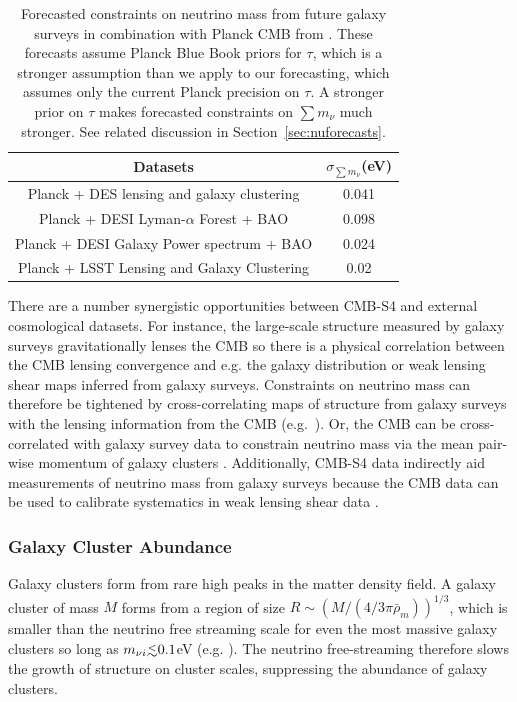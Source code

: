 \begin{table}[t!]
\begin{center}
\begin{tabular}{|c|c|} 
\hline
    				  Datasets 			& $\sigma_{\sum m_\nu}$(eV) \\
				  \hline
Planck + DES lensing and galaxy clustering 		& 			0.041		\\
\hline
Planck + DESI Lyman-$\alpha$ Forest + BAO           &			0.098		\\
\hline
Planck + DESI Galaxy Power spectrum + BAO         &			0.024		\\
\hline
Planck + LSST Lensing and Galaxy Clustering         &   0.02					\\
\hline
\end{tabular}
\caption{Forecasted constraints on neutrino mass from future galaxy surveys in combination with Planck CMB from \cite{Font-Ribera:2013rwa}.  These forecasts assume Planck Blue Book priors for $\tau$, which is a stronger assumption than we apply to our forecasting, which assumes only the current Planck precision on $\tau$. A stronger prior on $\tau$ makes forecasted constraints on $\sum m_\nu$ much stronger. See related discussion in Section~\ref{sec:nuforecasts}. }
\label{table:numassLSS}
\end{center}
\end{table}

There are a number synergistic opportunities between CMB-S4 and external cosmological datasets. For instance, the large-scale structure measured by galaxy surveys gravitationally lenses the CMB so there is a physical correlation between the CMB lensing convergence and e.g. the galaxy distribution or weak lensing shear maps inferred from galaxy surveys. Constraints on neutrino mass can therefore be tightened by cross-correlating maps of structure from galaxy surveys with the lensing information from the CMB (e.g.\ \cite{Takeuchi:2013gpa, Pearson:2013iha}). Or, the CMB can be cross-correlated with galaxy survey data to constrain neutrino mass via the mean pair-wise momentum of galaxy clusters \cite{Mueller:2014dba}. Additionally, CMB-S4 data indirectly aid measurements of neutrino mass from galaxy surveys because the CMB data can be used to calibrate systematics in weak lensing shear data \cite{Das:2013aia}. 



\subsubsection{Galaxy Cluster Abundance}
\label{sssec:mnucluster}
Galaxy clusters form from rare high peaks in the matter density field. A galaxy cluster of mass $M$ forms from a region of size $R\sim \left(M/(4/3\pi \bar\rho_m)\right)^{1/3}$, which is smaller than the neutrino free streaming scale for even the most massive galaxy clusters so long as $m_{\nu i} \lsim 0.1$eV (e.g. \cite{LoVerde:2013lta}). The neutrino free-streaming therefore slows the growth of structure on cluster scales, suppressing the abundance of galaxy clusters. 


